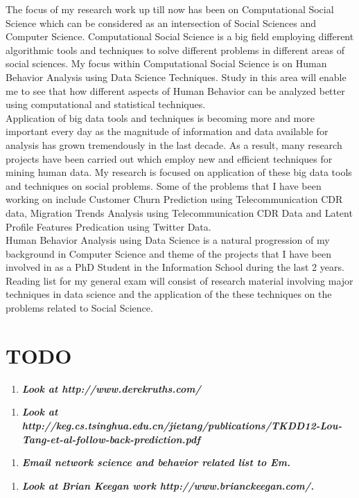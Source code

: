 
The focus of my research work up till now has been on Computational Social Science which can be considered as an intersection of Social Sciences and Computer Science. Computational Social Science is a big field employing different algorithmic tools and techniques to solve different problems in different areas of social sciences. My focus within Computational Social Science is on Human Behavior Analysis using Data Science Techniques. Study in this area will enable me to see that how different aspects of Human Behavior can be analyzed better using computational and statistical techniques.\\

Application of big data tools and techniques is becoming more and more important every day as the magnitude of information and data available for analysis has grown tremendously in the last decade. As a result, many research projects have been carried out which employ new and efficient techniques for mining human data. My research is focused on application of these big data tools and techniques on social problems. Some of the problems that I have been working on include Customer Churn Prediction using Telecommunication CDR data, Migration Trends Analysis using Telecommunication CDR Data and Latent Profile Features Predication using Twitter Data.\\ 

Human Behavior Analysis using Data Science is a natural progression of my background in Computer Science and theme of the projects that I have been involved in as a PhD Student in the Information School during the last 2 years.   Reading list for my general exam will consist of research material involving major techniques in data science and the application of the these techniques on the problems related to Social Science. 
\\
\section{TODO}
\begin{enumerate}
\item \textbf{\textit{Look at http://www.derekruths.com/}}
\end{enumerate}
\begin{enumerate}
\item \textbf{\textit{Look at http://keg.cs.tsinghua.edu.cn/jietang/publications/TKDD12-Lou-Tang-et-al-follow-back-prediction.pdf}}
\end{enumerate}
\begin{enumerate}
\item \textbf{\textit{Email network science and behavior related list to Em.}}
\end{enumerate}
\begin{enumerate}
\item \textbf{\textit{Look at Brian Keegan work http://www.brianckeegan.com/.}}
\end{enumerate}
